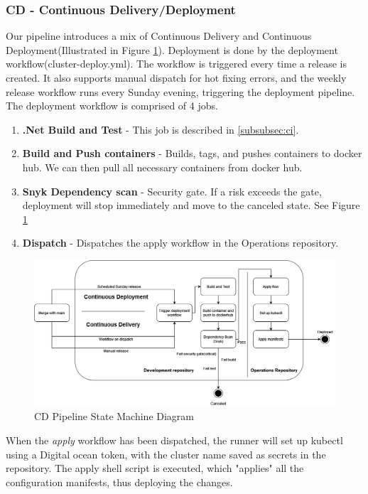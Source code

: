 \subsubsection{CD - Continuous Delivery/Deployment}
\label{subsubsec:cd}

Our pipeline introduces a mix of Continuous Delivery and Continuous Deployment(Illustrated in Figure \ref{fig:CDStateMachine}). Deployment is done by the deployment workflow(cluster-deploy.yml).
The workflow is triggered every time a release is created. It also supports manual dispatch for hot fixing errors, and the weekly release workflow runs every Sunday evening, triggering the deployment pipeline. The deployment workflow is comprised of 4 jobs.
\begin{enumerate}
    \item \textbf{.Net Build and Test} - This job is described in \ref{subsubsec:ci}.
    \item \textbf{Build and Push containers} - Builds, tags, and pushes containers to docker hub. We can then pull all necessary containers from docker hub.
    \item \textbf{Snyk Dependency scan} - Security gate. If a risk exceeds the gate, deployment will stop immediately and move to the canceled state. See Figure \ref{fig:CDStateMachine}
    \item \textbf{Dispatch} - Dispatches the apply workflow in the Operations repository.
\end{enumerate}

\begin{figure}[H]
    \centering
    \includegraphics[scale=0.44]{images/ci_cd_diagrams/DevopsDiagrams-StateMachineCd.drawio.png}
    \caption{CD Pipeline State Machine Diagram}
    \label{fig:CDStateMachine}
\end{figure}

When the \textit{apply} workflow has been dispatched, the runner will set up kubectl using a Digital ocean token, with the cluster name saved as secrets in the repository. The apply shell script is executed, which "applies" all the configuration manifests, thus deploying the changes.


